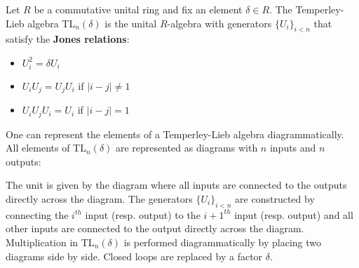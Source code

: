         \begin{example}
            Let $R$ be a commutative unital ring and fix an element $\delta\in R$. The Temperley-Lieb algebra TL$_n(\delta)$ is the unital $R$-algebra with generators $\{U_i\}_{i<n}$ that satisfy the \textbf{Jones relations}:
            \begin{itemize}
                \item $U_i^2 = \delta U_i$
                \item $U_i U_j = U_j U_i$ if $|i-j|\neq 1$
                \item $U_i U_j U_i = U_i$ if $|i-j| = 1$
            \end{itemize}
            One can represent the elements of a Temperley-Lieb algebra diagrammatically. All elements of TL$_n(\delta)$ are represented as diagrams with $n$ inputs and $n$ outputs:

            \hspace{1cm} The unit is given by the diagram where all inputs are connected to the outputs directly across the diagram. The generators $\{U_i\}_{i<n}$ are constructed by connecting the $i^{th}$ input (resp. output) to the $i+1^{th}$ input (resp. output) and all other inputs are connected to the output directly across the diagram.
            Multiplication in TL$_n(\delta)$ is performed diagrammatically by placing two diagrams side by side. Closed loops are replaced by a factor $\delta$.


\end{example}
